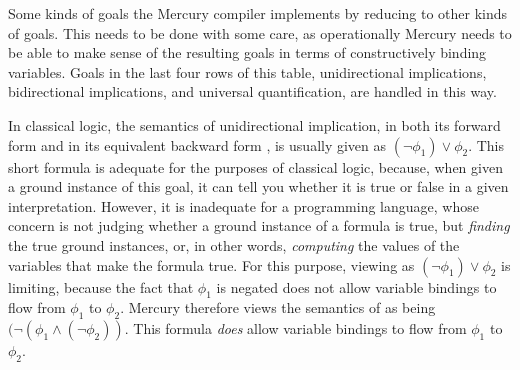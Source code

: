 %
%
%

Some kinds of goals
the Mercury compiler implements
by reducing to other kinds of goals.
This needs to be done with some care,
as operationally Mercury needs to be able to
make sense of the resulting goals in terms of
constructively binding variables.
Goals in the last four rows of this table,
unidirectional implications,
bidirectional implications,
and universal quantification,
are handled in this way.

In classical logic,
the semantics of unidirectional implication,
in both its forward  form
and in its equivalent backward form ,
is usually given as $(\lnot \phi_1) \lor \phi_2$.
This short formula is adequate for the purposes of classical logic,
because, when given a ground instance of this goal,
it can tell you whether it is true or false in a given interpretation.
However, it is inadequate for a programming language,
whose concern is not judging whether a ground instance of a formula is true,
but \emph{finding} the true ground instances,
or, in other words,
\emph{computing} the values of the variables that make the formula true.
For this purpose,
viewing  as $(\lnot \phi_1) \lor \phi_2$ is limiting,
because the fact that $\phi_1$ is negated
does not allow variable bindings to flow from $\phi_1$ to $\phi_2$.
Mercury therefore views the semantics of 
as being $(\lnot (\phi_1 \land (\lnot \phi_2))$.
This formula \emph{does} allow variable bindings
to flow from $\phi_1$ to $\phi_2$.

